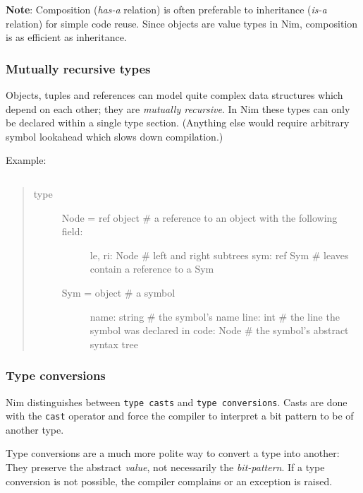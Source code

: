 \textbf{Note}: Composition (\emph{has-a} relation) is often preferable
to inheritance (\emph{is-a} relation) for simple code reuse. Since
objects are value types in Nim, composition is as efficient as
inheritance.

\hypertarget{mutually-recursive-types}{%
\subsubsection{Mutually recursive
types}\label{mutually-recursive-types}}

Objects, tuples and references can model quite complex data structures
which depend on each other; they are \emph{mutually recursive}. In Nim
these types can only be declared within a single type section. (Anything
else would require arbitrary symbol lookahead which slows down
compilation.)

Example:

\begin{verbatim}
\end{verbatim}

\begin{quote}
\begin{description}
\item[type]
\begin{description}
\item[Node = ref object \# a reference to an object with the following
field:]
le, ri: Node \# left and right subtrees sym: ref Sym \# leaves contain a
reference to a Sym
\item[Sym = object \# a symbol]
name: string \# the symbol's name line: int \# the line the symbol was
declared in code: Node \# the symbol's abstract syntax tree
\end{description}
\end{description}
\end{quote}

\hypertarget{type-conversions}{%
\subsubsection{Type conversions}\label{type-conversions}}

Nim distinguishes between \texttt{type\ casts} and
\texttt{type\ conversions}. Casts are done with the \texttt{cast}
operator and force the compiler to interpret a bit pattern to be of
another type.

Type conversions are a much more polite way to convert a type into
another: They preserve the abstract \emph{value}, not necessarily the
\emph{bit-pattern}. If a type conversion is not possible, the compiler
complains or an exception is raised.

